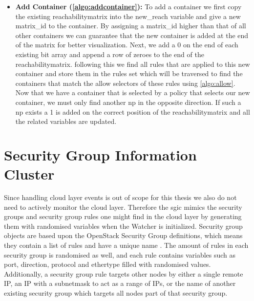 \begin{itemize}
    \item \textbf{Add Container (\autoref{algo:addcontainer}):} To add a container we first copy the existing reachabilitymatrix into the new\_reach variable and give a new matrix\_id to the container. By assigning a matrix\_id higher than that of all other containers we can guarantee that the new container is added at the end of the matrix for better visualization. Next, we add a 0 on the end of each existing bit array and append a row of zeroes to the end of the reachabilitymatrix. following this we find all rules that are applied to this new container and store them in the rules set which will be traversed to find the containers that match the allow selectors of these rules using \autoref{algo:allow}. Now that we have a container that is selected by a policy that selects our new container, we must only find another \acrshort{np} in the opposite direction. If such a \acrshort{np} exists a 1 is added on the correct position of the reachabilitymatrix and all the related variables are updated.
    
\end{itemize}






\newpage
\section{Security Group Information Cluster} \label{impl:sgic}
Since handling cloud layer events is out of scope for this thesis we also do not need to actively monitor the cloud layer. Therefore the \acrlong{sgic} mimics the security groups and security group rules one might find in the cloud layer by generating them with randomised variables when the Watcher is initialized. Security group objects are based upon the OpenStack Security Group definitions, which means they contain a list of rules and have a unique name \cite{secgroups}. The amount of rules in each security group is randomised as well, and each rule contains variables such as port, direction, protocol and ethertype filled with randomised values. Additionally, a security group rule targets other nodes by either a single remote IP, an IP with a subnetmask to act as a range of IPs, or the name of another existing security group which targets all nodes part of that security group.
\\[10pt]

